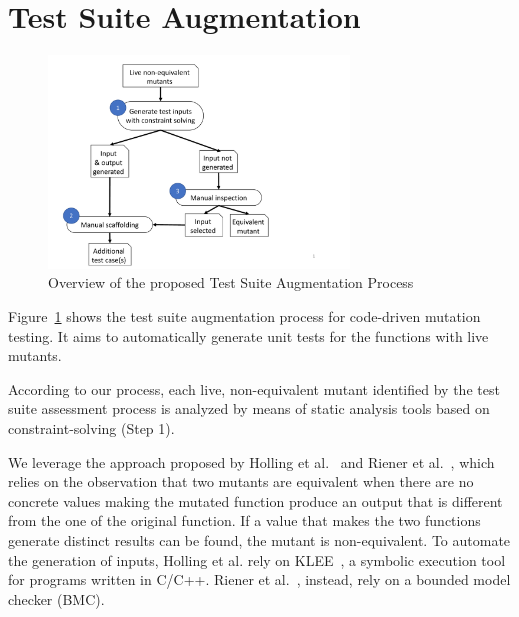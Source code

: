 \clearpage
\section{Test Suite Augmentation}
\label{sec:testGeneration}



\begin{figure}[tb]
\begin{center}
\includegraphics[width=8cm]{images/codeDrivenTestSuiteAugmentationProcess}
\caption{Overview of the proposed Test Suite Augmentation Process}
\label{fig:codeDrivenTestSuiteAugmentationProcess}
\end{center}
\end{figure}



Figure~\ref{fig:codeDrivenTestSuiteAugmentationProcess} shows the test suite augmentation process for code-driven mutation testing. 
It aims to automatically generate unit tests for the functions with live mutants.

According to our process, each live, non-equivalent mutant identified by the test suite assessment process is analyzed by means of static analysis tools based on constraint-solving (Step 1). 

We leverage the approach proposed by Holling et al.~\cite{holling2016nequivack} and Riener et al.~\cite{riener2011test}, which  relies on the observation that two mutants are equivalent when there are no concrete values making the mutated function produce an output that is different from the one of the original function.
If a value that makes the two functions generate distinct results can be found, the mutant is non-equivalent.
To automate the generation of inputs, Holling et al. rely on KLEE~\cite{cadar2008klee}, a symbolic execution tool for programs written in C/C++.
Riener et al.~\cite{riener2011test}, instead, rely on a bounded model checker (BMC).

